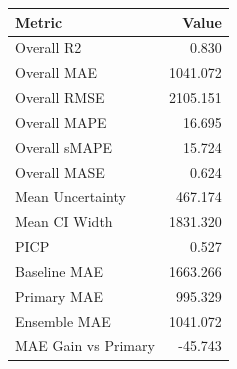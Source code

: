 \begin{tabular}{lr}
\toprule
Metric & Value \\
\midrule
Overall R2 & 0.830 \\
Overall MAE & 1041.072 \\
Overall RMSE & 2105.151 \\
Overall MAPE & 16.695 \\
Overall sMAPE & 15.724 \\
Overall MASE & 0.624 \\
Mean Uncertainty & 467.174 \\
Mean CI Width & 1831.320 \\
PICP & 0.527 \\
Baseline MAE & 1663.266 \\
Primary MAE & 995.329 \\
Ensemble MAE & 1041.072 \\
MAE Gain vs Primary & -45.743 \\
\bottomrule
\end{tabular}
